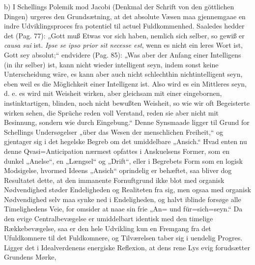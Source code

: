 \documentclass[12pt]{book}
\newcommand{\opage}[1]{\marginnote{\footnotesize\textit{[#1]}}}
\begin{document}
b) I Schellings Polemik mod Jacobi (Denkmal der Schrift von den göttlichen Dingen) urgeres
den Grundsætning, at det absolute Væsen maa gjennemgaae en indre Udviklingsproces fra
potentiel til actuel Fuldkommenhed. Saaledes hedder det (Pag. 77): „Gott muß Etwas vor
sich haben, nemlich sich selber, so gewiß er \textit{causa sui} ist. \textit{Ipse se ipso
prior sit necesse est}, wenn es nicht ein leres Wort ist, Gott sey absolut;“ endvidere
(Pag. 85): „Was
\opage{201} %
aber der Anfang einer Intelligens (in ihr selber) ist, kann nicht wieder intelligent seyn,
indem sonst keine Unterscheidung wäre, es kann aber auch nicht schlechthin nichtintelligent
seyn, eben weil es die Möglichkeit einer Intelligenz ist. Also wird es ein Mittleres seyn,
d. e. es wird mit Weisheit wirken, aber gleichsam mit einer eingebornen, instinktartigen,
blinden, noch nicht bewußten Weisheit, so wie wir oft Begeisterte wirken sehen, die
Sprüche reden voll Verstand, reden sie aber nicht mit Besinnung, sondern wie durch
Eingebung.“ Denne Synsmaade ligger til Grund for Schellings Undersøgelser „über das Wesen
der menschlichen Freiheit,“ og gjentager sig i det hegelske Begreb om det umiddelbare
„Ansich.“ Hvad enten nu denne Qvasi=Anticipation nærmest opfattes i Anskuelsens Former,
som en dunkel „Anelse“, en „Længsel“ og „Drift“, eller i Begrebets Form som en logisk
Modsigelse, hvormed Ideens „Ansich“ oprindelig er behæftet, saa bliver dog Resultatet
dette, at den immanente Fornuftgrund ikke blot med organisk Nødvendighed støder
Endeligheden og Realiteten fra sig, men ogsaa med organisk Nødvendighed selv maa synke ned
i Endeligheden, og halvt iblinde forsøge alle Timelighedens Veie, for omsider at naae sin
frie „An= und für=sich=seyn.“ Da den evige Centralbevægelse er umiddelbart identisk med
den timelige Rækkebevægelse, saa er den hele Udvikling kun en Fremgang fra det
Ufuldkomnere til det Fuldkomnere, og Tilværelsen taber sig i uendelig Progres. Ligger det
i Idealverdenens energiske Reflexion, at dens rene Lys evig forudsætter Grundens Mørke,
\end{document}
